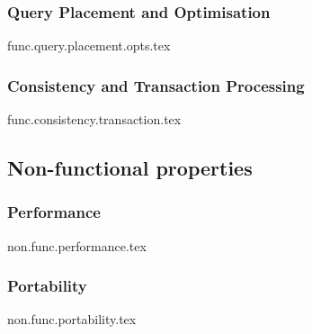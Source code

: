 \documentclass[a4paper, 11pt]{article}
\begin{document}
\subsubsection*{Query Placement and Optimisation}
{func.query.placement.opts.tex}

\subsubsection*{Consistency and Transaction Processing}
{func.consistency.transaction.tex}


\subsection*{Non-functional properties}
\subsubsection*{Performance}
{non.func.performance.tex}

\subsubsection*{Portability}
{non.func.portability.tex}


\printbibliography
\end{document}
